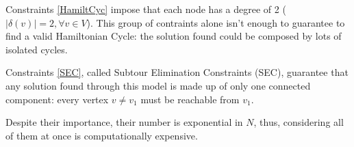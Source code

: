 Constraints \ref{HamiltCyc} impose that each node has a degree of 2 ($|\delta(v)| = 2,\forall v\in V$). This group of contraints alone isn't enough to guarantee to find a valid Hamiltonian Cycle: the solution found could be composed by lots of isolated cycles.

Constraints \ref{SEC}, called Subtour Elimination Constraints (SEC), guarantee that any solution found through this model is made up of only one connected component: every vertex $v\neq v_1$ must be reachable from $v_1$.

Despite their importance, their number is exponential in $N$, thus, considering all of them at once is computationally expensive.
